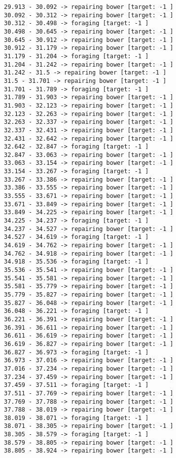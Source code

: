 \documentclass[11pt]{article}
\begin{document}
\begin{Verbatim}[commandchars=\\\{\}]
29.913 - 30.092 -> repairing bower [target: -1 ]
30.092 - 30.312 -> repairing bower [target: -1 ]
30.312 - 30.498 -> foraging [target: -1 ]
30.498 - 30.645 -> repairing bower [target: -1 ]
30.645 - 30.912 -> repairing bower [target: -1 ]
30.912 - 31.179 -> repairing bower [target: -1 ]
31.179 - 31.204 -> foraging [target: -1 ]
31.204 - 31.242 -> repairing bower [target: -1 ]
31.242 - 31.5 -> repairing bower [target: -1 ]
31.5 - 31.701 -> repairing bower [target: -1 ]
31.701 - 31.789 -> foraging [target: -1 ]
31.789 - 31.903 -> repairing bower [target: -1 ]
31.903 - 32.123 -> repairing bower [target: -1 ]
32.123 - 32.263 -> repairing bower [target: -1 ]
32.263 - 32.337 -> repairing bower [target: -1 ]
32.337 - 32.431 -> repairing bower [target: -1 ]
32.431 - 32.642 -> repairing bower [target: -1 ]
32.642 - 32.847 -> foraging [target: -1 ]
32.847 - 33.063 -> repairing bower [target: -1 ]
33.063 - 33.154 -> repairing bower [target: -1 ]
33.154 - 33.267 -> foraging [target: -1 ]
33.267 - 33.386 -> repairing bower [target: -1 ]
33.386 - 33.555 -> repairing bower [target: -1 ]
33.555 - 33.671 -> repairing bower [target: -1 ]
33.671 - 33.849 -> repairing bower [target: -1 ]
33.849 - 34.225 -> repairing bower [target: -1 ]
34.225 - 34.237 -> foraging [target: -1 ]
34.237 - 34.527 -> repairing bower [target: -1 ]
34.527 - 34.619 -> foraging [target: -1 ]
34.619 - 34.762 -> repairing bower [target: -1 ]
34.762 - 34.918 -> repairing bower [target: -1 ]
34.918 - 35.536 -> foraging [target: -1 ]
35.536 - 35.541 -> repairing bower [target: -1 ]
35.541 - 35.581 -> repairing bower [target: -1 ]
35.581 - 35.779 -> repairing bower [target: -1 ]
35.779 - 35.827 -> repairing bower [target: -1 ]
35.827 - 36.048 -> repairing bower [target: -1 ]
36.048 - 36.221 -> foraging [target: -1 ]
36.221 - 36.391 -> repairing bower [target: -1 ]
36.391 - 36.611 -> repairing bower [target: -1 ]
36.611 - 36.619 -> repairing bower [target: -1 ]
36.619 - 36.827 -> repairing bower [target: -1 ]
36.827 - 36.973 -> foraging [target: -1 ]
36.973 - 37.016 -> repairing bower [target: -1 ]
37.016 - 37.234 -> repairing bower [target: -1 ]
37.234 - 37.459 -> repairing bower [target: -1 ]
37.459 - 37.511 -> foraging [target: -1 ]
37.511 - 37.769 -> repairing bower [target: -1 ]
37.769 - 37.788 -> repairing bower [target: -1 ]
37.788 - 38.019 -> repairing bower [target: -1 ]
38.019 - 38.071 -> foraging [target: -1 ]
38.071 - 38.305 -> repairing bower [target: -1 ]
38.305 - 38.579 -> foraging [target: -1 ]
38.579 - 38.805 -> repairing bower [target: -1 ]
38.805 - 38.924 -> repairing bower [target: -1 ]

\end{Verbatim}
\end{document}
